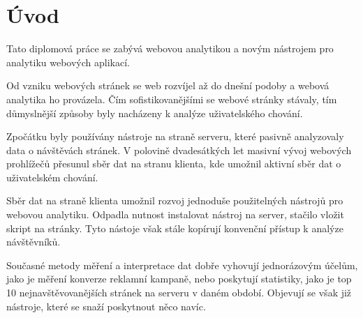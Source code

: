 \documentclass[bc,male,java,dept456]{diploma}						%
\begin{document}
\MakeTitlePages

\tableofcontents
\cleardoublepage	%

\listoftables
\cleardoublepage	%

\listoffigures
\cleardoublepage	%


\lstlistoflistings
\cleardoublepage	%










\section{Úvod}
\label{sec:Uvod}


Tato diplomová práce se zabývá webovou analytikou a novým nástrojem pro analytiku webových aplikací. 

Od vzniku webových stránek se web rozvíjel až do dnešní podoby a webová analytika ho provázela. Čím sofistikovanějšími se webové stránky stávaly, tím důmyslnější způsoby byly nacházeny k analýze uživatelského chování.

Zpočátku byly používány nástroje na straně serveru, které pasivně analyzovaly data o návštěvách stránek. V polovině dvadesátkých let masivní vývoj webových prohlížečů přesunul sběr dat na stranu klienta, kde umožnil aktivní sběr dat o uživatelském chování.

Sběr dat na straně klienta umožnil rozvoj jednoduše použitelných nástrojů pro webovou analytiku. Odpadla nutnost instalovat nástroj na server, stačilo vložit skript na stránky. Tyto nástoje však stále kopírují konvenční přístup k analýze návštěvníků.

Současné metody měření a interpretace dat dobře vyhovují jednorázovým účelům, jako je měření konverze reklamní kampaně, nebo poskytují statistiky, jako je top 10 nejnavštěvovanějších stránek na serveru v daném období. Objevují se však již nástroje, které se snaží poskytnout něco navíc.
\end{document}
